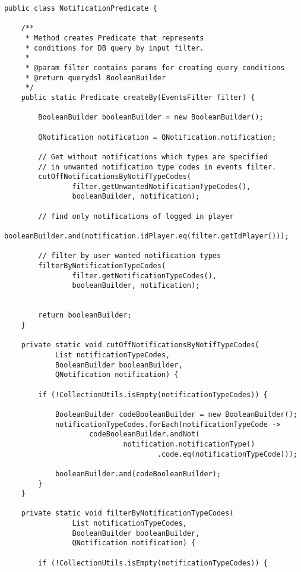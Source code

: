 \documentclass[12pt]{article}
\begin{document}
{\clearpage

\begin{lstlisting}
public class NotificationPredicate {

    /**
     * Method creates Predicate that represents
     * conditions for DB query by input filter.
     *
     * @param filter contains params for creating query conditions
     * @return querydsl BooleanBuilder
     */
    public static Predicate createBy(EventsFilter filter) {

        BooleanBuilder booleanBuilder = new BooleanBuilder();

        QNotification notification = QNotification.notification;

        // Get without notifications which types are specified
        // in unwanted notification type codes in events filter.
        cutOffNotificationsByNotifTypeCodes(
                filter.getUnwantedNotificationTypeCodes(),
                booleanBuilder, notification);

        // find only notifications of logged in player
        booleanBuilder.and(notification.idPlayer.eq(filter.getIdPlayer()));

        // filter by user wanted notification types
        filterByNotificationTypeCodes(
                filter.getNotificationTypeCodes(),
                booleanBuilder, notification);


        return booleanBuilder;
    }

    private static void cutOffNotificationsByNotifTypeCodes(
            List notificationTypeCodes,
            BooleanBuilder booleanBuilder,
            QNotification notification) {

        if (!CollectionUtils.isEmpty(notificationTypeCodes)) {

            BooleanBuilder codeBooleanBuilder = new BooleanBuilder();
            notificationTypeCodes.forEach(notificationTypeCode ->
                    codeBooleanBuilder.andNot(
                            notification.notificationType()
                                    .code.eq(notificationTypeCode)));

            booleanBuilder.and(codeBooleanBuilder);
        }
    }

    private static void filterByNotificationTypeCodes(
                List notificationTypeCodes,
                BooleanBuilder booleanBuilder,
                QNotification notification) {

        if (!CollectionUtils.isEmpty(notificationTypeCodes)) {


\end{lstlisting}}
\end{document}

